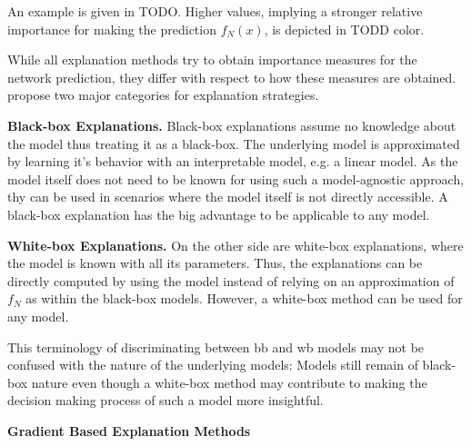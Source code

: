An example is given in TODO. Higher values, implying a stronger relative importance for making the prediction $f_N(x)$, is depicted in TODD color. 



While all explanation methods try to obtain importance measures for the network prediction, they differ with respect to how these measures are obtained. 
\cite{evaluating_explanations_security} propose two major categories for explanation strategies.

\noindent\textbf{Black-box Explanations.} Black-box explanations assume no knowledge about the model thus treating it as a black-box. The underlying model is approximated by learning it's behavior with an interpretable model, e.g. a linear model. As the model itself does not need to be known for using such a model-agnostic approach, thy can be used in scenarios where the model itself is not directly accessible. A black-box explanation has the big advantage to be applicable to any model.


\noindent\textbf{White-box Explanations.} On the other side are white-box explanations, where the model is known with all its parameters. Thus, the explanations can be directly computed by using the model instead of relying on an approximation of $f_N$ as within the black-box models. 
However, a white-box method can be used for any model. 

This terminology of discriminating between bb and wb models may not be confused with the nature of the underlying models: Models still remain of black-box nature even though a white-box method may contribute to making the decision making process of such a model more insightful. %







\noindent\textbf{Gradient Based Explanation Methods}

